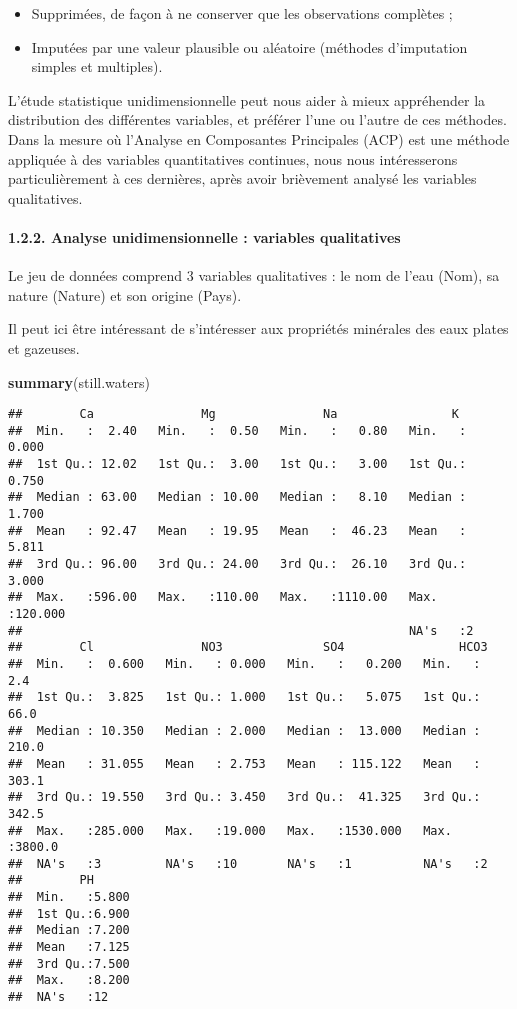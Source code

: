 \documentclass[]{article}
\newenvironment{Shaded}{\begin{snugshade}}{\end{snugshade}}
\newcommand{\KeywordTok}[1]{\textcolor[rgb]{0.13,0.29,0.53}{\textbf{#1}}}
\newcommand{\NormalTok}[1]{#1}
\providecommand{\tightlist}{%
  \setlength{\itemsep}{0pt}\setlength{\parskip}{0pt}}
\let\oldparagraph\paragraph
\renewcommand{\paragraph}[1]{\oldparagraph{#1}\mbox{}}
\begin{document}
\begin{itemize}
\tightlist
\item
  Supprimées, de façon à ne conserver que les observations complètes ;
\item
  Imputées par une valeur plausible ou aléatoire (méthodes d'imputation
  simples et multiples).
\end{itemize}

L'étude statistique unidimensionnelle peut nous aider à mieux
appréhender la distribution des différentes variables, et préférer l'une
ou l'autre de ces méthodes. Dans la mesure où l'Analyse en Composantes
Principales (ACP) est une méthode appliquée à des variables
quantitatives continues, nous nous intéresserons particulièrement à ces
dernières, après avoir brièvement analysé les variables qualitatives.

\hypertarget{analyse-unidimensionnelle-variables-qualitatives}{\paragraph{1.2.2.
Analyse unidimensionnelle : variables
qualitatives}\label{analyse-unidimensionnelle-variables-qualitatives}}

Le jeu de données comprend 3 variables qualitatives : le nom de l'eau
(Nom), sa nature (Nature) et son origine (Pays).

Il peut ici être intéressant de s'intéresser aux propriétés minérales
des eaux plates et gazeuses.

\begin{Shaded}
\begin{Highlighting}[]
\KeywordTok{summary}\NormalTok{(still.waters)}
\end{Highlighting}
\end{Shaded}

\begin{verbatim}
##        Ca               Mg               Na                K          
##  Min.   :  2.40   Min.   :  0.50   Min.   :   0.80   Min.   :  0.000  
##  1st Qu.: 12.02   1st Qu.:  3.00   1st Qu.:   3.00   1st Qu.:  0.750  
##  Median : 63.00   Median : 10.00   Median :   8.10   Median :  1.700  
##  Mean   : 92.47   Mean   : 19.95   Mean   :  46.23   Mean   :  5.811  
##  3rd Qu.: 96.00   3rd Qu.: 24.00   3rd Qu.:  26.10   3rd Qu.:  3.000  
##  Max.   :596.00   Max.   :110.00   Max.   :1110.00   Max.   :120.000  
##                                                      NA's   :2        
##        Cl               NO3              SO4                HCO3       
##  Min.   :  0.600   Min.   : 0.000   Min.   :   0.200   Min.   :   2.4  
##  1st Qu.:  3.825   1st Qu.: 1.000   1st Qu.:   5.075   1st Qu.:  66.0  
##  Median : 10.350   Median : 2.000   Median :  13.000   Median : 210.0  
##  Mean   : 31.055   Mean   : 2.753   Mean   : 115.122   Mean   : 303.1  
##  3rd Qu.: 19.550   3rd Qu.: 3.450   3rd Qu.:  41.325   3rd Qu.: 342.5  
##  Max.   :285.000   Max.   :19.000   Max.   :1530.000   Max.   :3800.0  
##  NA's   :3         NA's   :10       NA's   :1          NA's   :2       
##        PH       
##  Min.   :5.800  
##  1st Qu.:6.900  
##  Median :7.200  
##  Mean   :7.125  
##  3rd Qu.:7.500  
##  Max.   :8.200  
##  NA's   :12
\end{verbatim}
\end{document}
